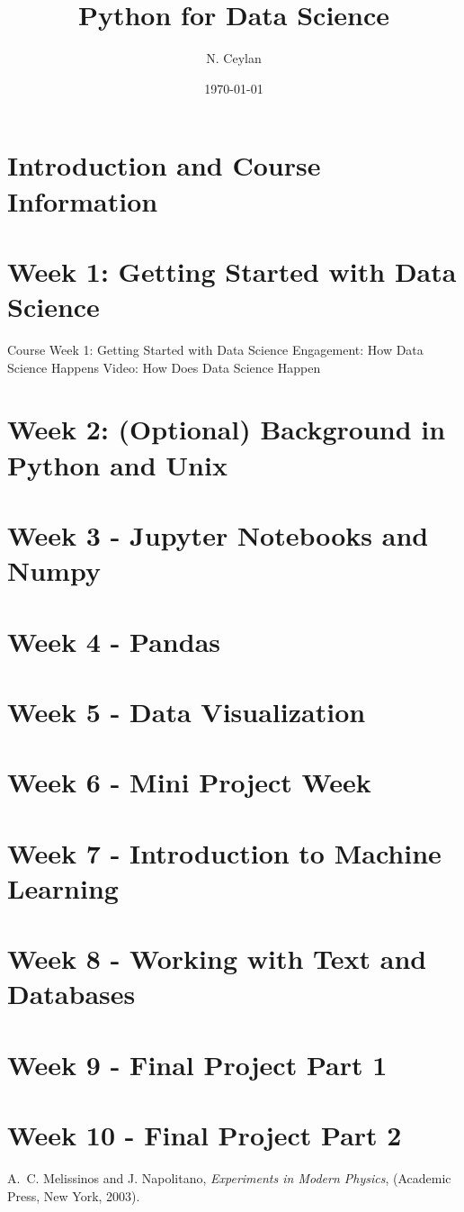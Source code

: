 \documentclass[letterpaper,12pt]{article}
\begin{document}
\title{Python for Data Science}
\author{N. Ceylan}
\date{\today}
\maketitle


\section{Introduction and Course Information}

\section{Week 1: Getting Started with Data Science}



Course   Week 1: Getting Started with Data Science   Engagement: How Data Science Happens   Video: How Does Data Science Happen


\section{Week 2: (Optional) Background in Python and Unix}

\section{Week 3 - Jupyter Notebooks and Numpy}



\section{Week 4 - Pandas}


\section{Week 5 - Data Visualization
}


\section{Week 6 - Mini Project Week
}

\section{Week 7 - Introduction to Machine Learning
}
\section{Week 8 - Working with Text and Databases
}


\section{Week 9 - Final Project Part 1
}

\section{Week 10 - Final Project Part 2
}

\begin{thebibliography}{99}

A.~C. Melissinos and J. Napolitano, \textit{Experiments in Modern Physics},
(Academic Press, New York, 2003).


\end{thebibliography}
\end{document}
